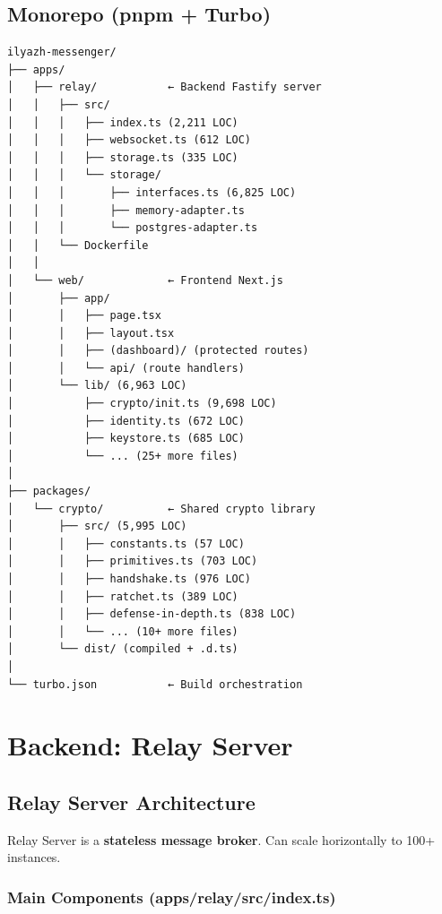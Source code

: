 \documentclass[11pt,a4paper,oneside]{book}
\begin{document}
\vspace{-0.3cm}\section{Monorepo (pnpm + Turbo)}
\begin{verbatim}
ilyazh-messenger/
├── apps/
│   ├── relay/           ← Backend Fastify server
│   │   ├── src/
│   │   │   ├── index.ts (2,211 LOC)
│   │   │   ├── websocket.ts (612 LOC)
│   │   │   ├── storage.ts (335 LOC)
│   │   │   └── storage/
│   │   │       ├── interfaces.ts (6,825 LOC)
│   │   │       ├── memory-adapter.ts
│   │   │       └── postgres-adapter.ts
│   │   └── Dockerfile
│   │
│   └── web/             ← Frontend Next.js
│       ├── app/
│       │   ├── page.tsx
│       │   ├── layout.tsx
│       │   ├── (dashboard)/ (protected routes)
│       │   └── api/ (route handlers)
│       └── lib/ (6,963 LOC)
│           ├── crypto/init.ts (9,698 LOC)
│           ├── identity.ts (672 LOC)
│           ├── keystore.ts (685 LOC)
│           └── ... (25+ more files)
│
├── packages/
│   └── crypto/          ← Shared crypto library
│       ├── src/ (5,995 LOC)
│       │   ├── constants.ts (57 LOC)
│       │   ├── primitives.ts (703 LOC)
│       │   ├── handshake.ts (976 LOC)
│       │   ├── ratchet.ts (389 LOC)
│       │   ├── defense-in-depth.ts (838 LOC)
│       │   └── ... (10+ more files)
│       └── dist/ (compiled + .d.ts)
│
└── turbo.json           ← Build orchestration
\end{verbatim}
\vspace{-0.5cm}\chapter{Backend: Relay Server}
\vspace{-0.3cm}\section{Relay Server Architecture}
Relay Server is a \textbf{stateless message broker}. Can scale horizontally to 100+ instances.
\vspace{-0.2cm}\subsection{Main Components (apps/relay/src/index.ts)}
\end{document}
